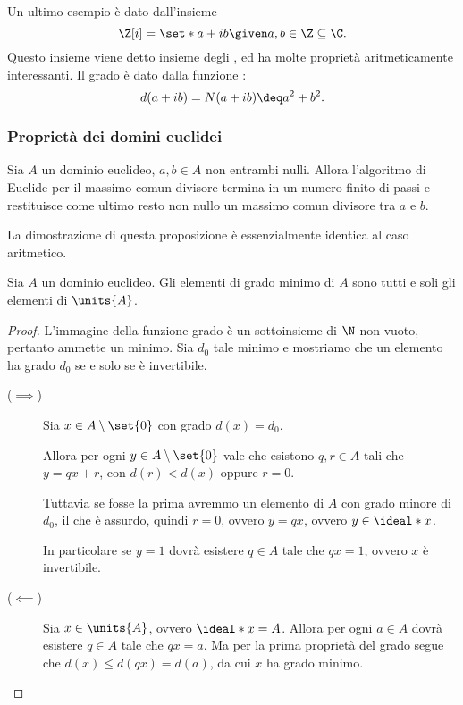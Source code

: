 Un ultimo esempio è dato dall'insieme \[
    \Z[i] = \set*{a + ib \given a, b \in \Z} \subseteq \C.    
\] Questo insieme viene detto insieme degli , ed ha molte proprietà aritmeticamente interessanti. Il grado è dato dalla funzione : \[
    d(a + ib) = N(a + ib) \deq a^2 + b^2.
\]

\subsubsection{Proprietà dei domini euclidei}

\begin{proposition}
    Sia $A$ un dominio euclideo, $a, b \in A$ non entrambi nulli. Allora l'algoritmo di Euclide per il massimo comun divisore termina in un numero finito di passi e restituisce come ultimo resto non nullo un massimo comun divisore tra $a$ e $b$.
\end{proposition}
La dimostrazione di questa proposizione è essenzialmente identica al caso aritmetico.

\begin{proposition}
    Sia $A$ un dominio euclideo. Gli elementi di grado minimo di $A$ sono tutti e soli gli elementi di $\units{A}$.
\end{proposition}
\begin{proof}
    L'immagine della funzione grado è un sottoinsieme di $\N$ non vuoto, pertanto ammette un minimo. Sia $d_0$ tale minimo e mostriamo che un elemento ha grado $d_0$ se e solo se è invertibile.
    
    \begin{description}
        \item[($\implies$)] Sia $x \in A \setminus \set{0}$ con grado $d(x) = d_0$. 
        
        Allora per ogni $y \in A \setminus \set{0}$ vale che esistono $q, r \in A$ tali che $y = qx + r$, con $d(r) < d(x)$ oppure $r = 0$. 
        
        Tuttavia se fosse la prima avremmo un elemento di $A$ con grado minore di $d_0$, il che è assurdo, quindi $r = 0$, ovvero $y = qx$, ovvero $y \in \ideal*{x}$.

        In particolare se $y = 1$ dovrà esistere $q \in A$ tale che $qx = 1$, ovvero $x$ è invertibile.
        \item[($\impliedby$)] Sia $x \in \units{A}$, ovvero $\ideal*{x} = A$. Allora per ogni $a \in A$ dovrà esistere $q \in A$ tale che $qx = a$. Ma per la prima proprietà del grado segue che $d(x) \leq d(qx) = d(a)$, da cui $x$ ha grado minimo. \qedhere
    \end{description}
\end{proof}

